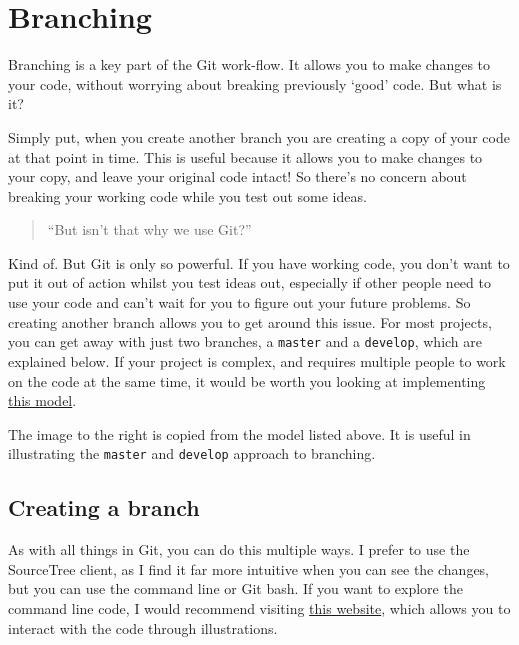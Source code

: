 \documentclass[]{book}
\begin{document}
\hypertarget{branching}{%
\section{Branching}\label{branching}}

Branching is a key part of the Git work-flow. It allows you to make changes to your code, without worrying about breaking previously `good' code. But what is it?

Simply put, when you create another branch you are creating a copy of your code at that point in time. This is useful because it allows you to make changes to your copy, and leave your original code intact! So there's no concern about breaking your working code while you test out some ideas.

\begin{quote}
``But isn't that why we use Git?''
\end{quote}

Kind of. But Git is only so powerful. If you have working code, you don't want to put it out of action whilst you test ideas out, especially if other people need to use your code and can't wait for you to figure out your future problems. So creating another branch allows you to get around this issue. For most projects, you can get away with just two branches, a \texttt{master} and a \texttt{develop}, which are explained below. If your project is complex, and requires multiple people to work on the code at the same time, it would be worth you looking at implementing \href{https://nvie.com/posts/a-successful-Git-branching-model/}{this model}.

The image to the right is copied from the model listed above. It is useful in illustrating the \texttt{master} and \texttt{develop} approach to branching.

\hypertarget{creating-a-branch}{%
\subsection{Creating a branch}\label{creating-a-branch}}

As with all things in Git, you can do this multiple ways. I prefer to use the SourceTree client, as I find it far more intuitive when you can see the changes, but you can use the command line or Git bash. If you want to explore the command line code, I would recommend visiting \href{https://learnGitbranching.js.org/}{this website}, which allows you to interact with the code through illustrations.
\end{document}
